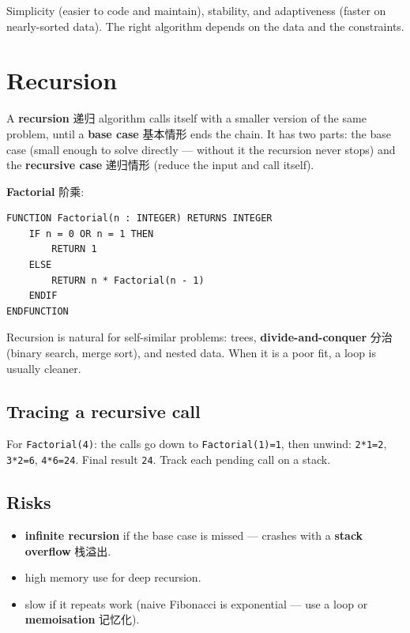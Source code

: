 \documentclass[11pt]{article}
\begin{document}
Simplicity (easier to code and maintain), stability, and adaptiveness (faster on nearly-sorted data). The right algorithm depends on the data and the constraints.

\section*{Recursion}

A \textbf{recursion} 递归 algorithm calls itself with a smaller version of the same problem, until a \textbf{base case} 基本情形 ends the chain. It has two parts: the base case (small enough to solve directly — without it the recursion never stops) and the \textbf{recursive case} 递归情形 (reduce the input and call itself).

\textbf{Factorial} 阶乘:

\begin{Verbatim}
FUNCTION Factorial(n : INTEGER) RETURNS INTEGER
    IF n = 0 OR n = 1 THEN
        RETURN 1
    ELSE
        RETURN n * Factorial(n - 1)
    ENDIF
ENDFUNCTION
\end{Verbatim}

Recursion is natural for self-similar problems: trees, \textbf{divide-and-conquer} 分治 (binary search, merge sort), and nested data. When it is a poor fit, a loop is usually cleaner.

\subsection*{Tracing a recursive call}

For \texttt{Factorial(4)}: the calls go down to \texttt{Factorial(1)=1}, then unwind: \texttt{2*1=2}, \texttt{3*2=6}, \texttt{4*6=24}. Final result \texttt{24}. Track each pending call on a stack.

\subsection*{Risks}

\begin{itemize}
\item \textbf{infinite recursion} if the base case is missed — crashes with a \textbf{stack overflow} 栈溢出.

\item high memory use for deep recursion.

\item slow if it repeats work (naive Fibonacci is exponential — use a loop or \textbf{memoisation} 记忆化).

\end{itemize}
\end{document}
